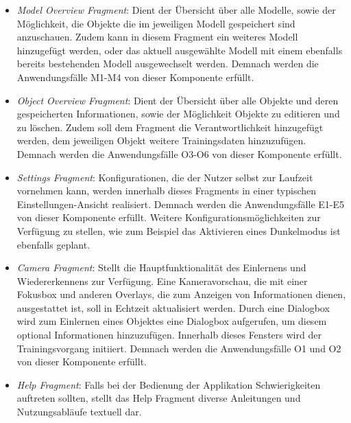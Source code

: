 \documentclass[oneside]{ausarbeitung}
\begin{document}
\begin{itemize}
	\item \textit{Model Overview Fragment}: Dient der Übersicht über alle Modelle, sowie der Möglichkeit, die Objekte die im jeweiligen Modell gespeichert sind anzuschauen. Zudem kann in diesem Fragment ein weiteres Modell hinzugefügt werden, oder das aktuell ausgewählte Modell mit einem ebenfalls bereits bestehenden Modell ausgewechselt werden. Demnach werden die Anwendungsfälle M1-M4 von dieser Komponente erfüllt.

	\item \textit{Object Overview Fragment}: Dient der Übersicht über alle Objekte und deren gespeicherten Informationen, sowie der Möglichkeit Objekte zu editieren und zu löschen. Zudem soll dem Fragment die Verantwortlichkeit hinzugefügt werden, dem jeweiligen Objekt weitere Trainingsdaten hinzuzufügen. Demnach werden die Anwendungsfälle O3-O6 von dieser Komponente erfüllt.
	
	\item \textit{Settings Fragment}: Konfigurationen, die der Nutzer selbst zur Laufzeit vornehmen kann, werden innerhalb dieses Fragments in einer typischen Einstellungen-Ansicht realisiert. Demnach werden die Anwendungsfälle E1-E5 von dieser Komponente erfüllt. Weitere Konfigurationsmöglichkeiten zur Verfügung zu stellen, wie zum Beispiel das Aktivieren eines Dunkelmodus ist ebenfalls geplant.
	
	\item \textit{Camera Fragment}: Stellt die Hauptfunktionalität des Einlernens und Wiedererkennens zur Verfügung. Eine Kameravorschau, die mit einer Fokusbox und anderen Overlays, die zum Anzeigen von Informationen dienen, ausgestattet ist, soll in Echtzeit aktualisiert werden. Durch eine Dialogbox wird zum Einlernen eines Objektes eine Dialogbox aufgerufen, um diesem optional Informationen hinzuzufügen. Innerhalb dieses Fensters wird der Trainingsvorgang initiiert. Demnach werden die Anwendungsfälle O1 und O2 von dieser Komponente erfüllt.
	
	\item \textit{Help Fragment}: Falls bei der Bedienung der Applikation Schwierigkeiten auftreten sollten, stellt das Help Fragment diverse Anleitungen und Nutzungsabläufe textuell dar.

\end{itemize}
\end{document}
